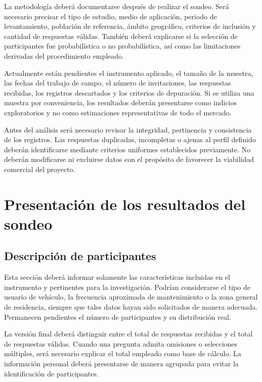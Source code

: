 \documentclass[12pt,letterpaper,oneside]{article}
\begin{document}
La metodología deberá documentarse después de realizar el sondeo. Será necesario precisar el tipo de estudio, medio de aplicación, periodo de levantamiento, población de referencia, ámbito geográfico, criterios de inclusión y cantidad de respuestas válidas. También deberá explicarse si la selección de participantes fue probabilística o no probabilística, así como las limitaciones derivadas del procedimiento empleado.

Actualmente están pendientes el instrumento aplicado, el tamaño de la muestra, las fechas del trabajo de campo, el número de invitaciones, las respuestas recibidas, los registros descartados y los criterios de depuración. Si se utiliza una muestra por conveniencia, los resultados deberán presentarse como indicios exploratorios y no como estimaciones representativas de todo el mercado.

Antes del análisis será necesario revisar la integridad, pertinencia y consistencia de los registros. Las respuestas duplicadas, incompletas o ajenas al perfil definido deberán identificarse mediante criterios uniformes establecidos previamente. No deberán modificarse ni excluirse datos con el propósito de favorecer la viabilidad comercial del proyecto.

\section{Presentación de los resultados del sondeo}

\subsection{Descripción de participantes}

Esta sección deberá informar solamente las características incluidas en el instrumento y pertinentes para la investigación. Podrían considerarse el tipo de usuario de vehículo, la frecuencia aproximada de mantenimiento o la zona general de residencia, siempre que tales datos hayan sido solicitados de manera adecuada. Permanecen pendientes el número de participantes y su distribución real.

La versión final deberá distinguir entre el total de respuestas recibidas y el total de respuestas válidas. Cuando una pregunta admita omisiones o selecciones múltiples, será necesario explicar el total empleado como base de cálculo. La información personal deberá presentarse de manera agrupada para evitar la identificación de participantes.
\end{document}
